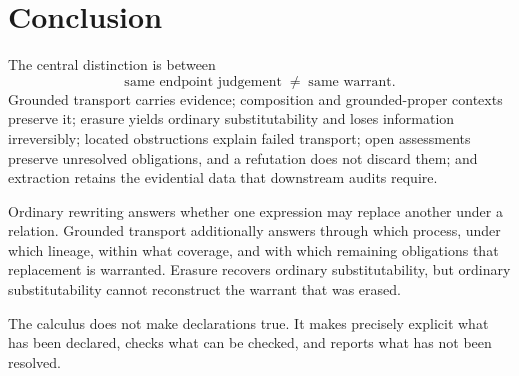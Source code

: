\section{Conclusion}\label{sec:conclusion}

The central distinction is between
\[
\text{same endpoint judgement} \;\neq\; \text{same warrant}.
\]
Grounded transport carries evidence; composition and grounded-proper contexts preserve it; erasure yields ordinary substitutability and loses information irreversibly; located obstructions explain failed transport; open assessments preserve unresolved obligations, and a refutation does not discard them; and extraction retains the evidential data that downstream audits require.

Ordinary rewriting answers whether one expression may replace another under a relation. Grounded transport additionally answers through which process, under which lineage, within what coverage, and with which remaining obligations that replacement is warranted. Erasure recovers ordinary substitutability, but ordinary substitutability cannot reconstruct the warrant that was erased.

The calculus does not make declarations true. It makes precisely explicit what has been declared, checks what can be checked, and reports what has not been resolved.
